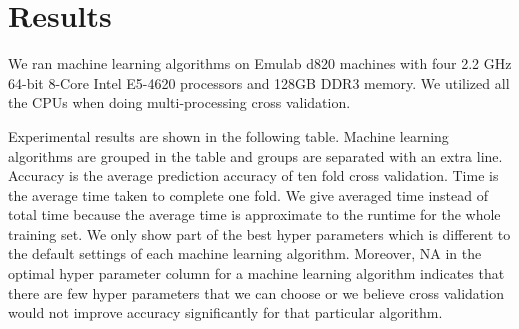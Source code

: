 \section{Results}
We ran machine learning algorithms on Emulab d820 machines with four 2.2 GHz 64-bit 8-Core Intel E5-4620 processors and 128GB DDR3 memory. We utilized all the CPUs when doing multi-processing cross validation.

Experimental results are shown in the following table. Machine learning algorithms are grouped in the table and groups are separated with an extra line. Accuracy is the average prediction accuracy of ten fold cross validation. Time is the average time taken to complete one fold. We give averaged time instead of total time because the average time is approximate to the runtime for the whole training set. We only show part of the best hyper parameters which is different to the default settings of each machine learning algorithm. Moreover, NA in the optimal hyper parameter column for a machine learning algorithm indicates that there are few hyper parameters that we can choose or we believe cross validation would not improve accuracy significantly for that particular algorithm.

